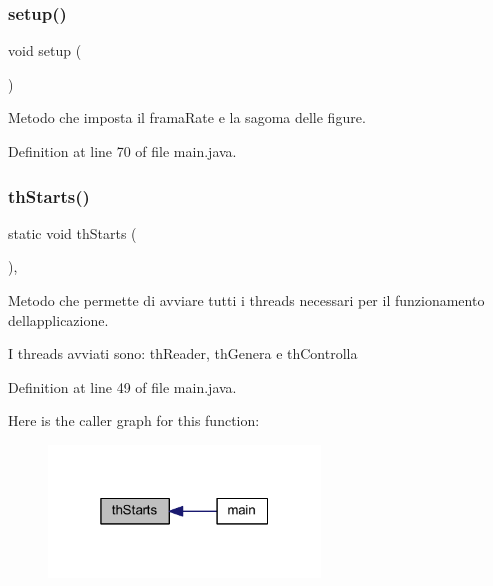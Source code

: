 \subsubsection{\texorpdfstring{setup()}{setup()}}
{\footnotesize\ttfamily void setup (\begin{DoxyParamCaption}{ }\end{DoxyParamCaption})}



Metodo che imposta il frama\+Rate e la sagoma delle figure. 



Definition at line 70 of file main.\+java.

\mbox{\label{classmain_a28055606ff9f6030517770a96e4864e8}} 
\subsubsection{\texorpdfstring{th\+Starts()}{thStarts()}}
{\footnotesize\ttfamily static void th\+Starts (\begin{DoxyParamCaption}{ }\end{DoxyParamCaption})\hspace{0.3cm}{\ttfamily [static]}, {\ttfamily [private]}}



Metodo che permette di avviare tutti i threads necessari per il funzionamento dell\textquotesingle{}applicazione. 

I threads avviati sono\+: th\+Reader, th\+Genera e th\+Controlla 

Definition at line 49 of file main.\+java.

Here is the caller graph for this function\+:
\nopagebreak
\begin{figure}[H]
\begin{center}
\leavevmode
\includegraphics[width=205pt]{classmain_a28055606ff9f6030517770a96e4864e8_icgraph}
\end{center}
\end{figure}


